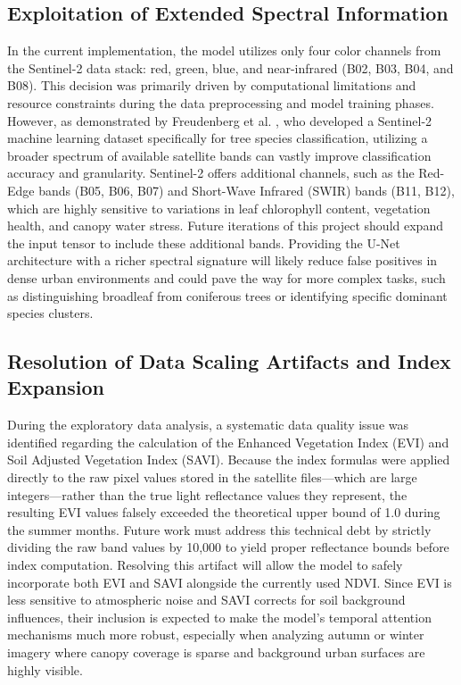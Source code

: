 \subsection{Exploitation of Extended Spectral Information}
In the current implementation, the model utilizes only four color channels from the Sentinel-2 data stack: red, green, blue, and near-infrared (B02, B03, B04, and B08). This decision was primarily driven by computational limitations and resource constraints during the data preprocessing and model training phases. However, as demonstrated by Freudenberg et al. \cite{freudenberg2025sentinel2}, who developed a Sentinel-2 machine learning dataset specifically for tree species classification, utilizing a broader spectrum of available satellite bands can vastly improve classification accuracy and granularity. Sentinel-2 offers additional channels, such as the Red-Edge bands (B05, B06, B07) and Short-Wave Infrared (SWIR) bands (B11, B12), which are highly sensitive to variations in leaf chlorophyll content, vegetation health, and canopy water stress. Future iterations of this project should expand the input tensor to include these additional bands. Providing the U-Net architecture with a richer spectral signature will likely reduce false positives in dense urban environments and could pave the way for more complex tasks, such as distinguishing broadleaf from coniferous trees or identifying specific dominant species clusters.

\subsection{Resolution of Data Scaling Artifacts and Index Expansion}
During the exploratory data analysis, a systematic data quality issue was identified regarding the calculation of the Enhanced Vegetation Index (EVI) and Soil Adjusted Vegetation Index (SAVI). Because the index formulas were applied directly to the raw pixel values stored in the satellite files---which are large integers---rather than the true light reflectance values they represent, the resulting EVI values falsely exceeded the theoretical upper bound of 1.0 during the summer months. Future work must address this technical debt by strictly dividing the raw band values by 10,000 to yield proper reflectance bounds before index computation. Resolving this artifact will allow the model to safely incorporate both EVI and SAVI alongside the currently used NDVI. Since EVI is less sensitive to atmospheric noise and SAVI corrects for soil background influences, their inclusion is expected to make the model's temporal attention mechanisms much more robust, especially when analyzing autumn or winter imagery where canopy coverage is sparse and background urban surfaces are highly visible.

